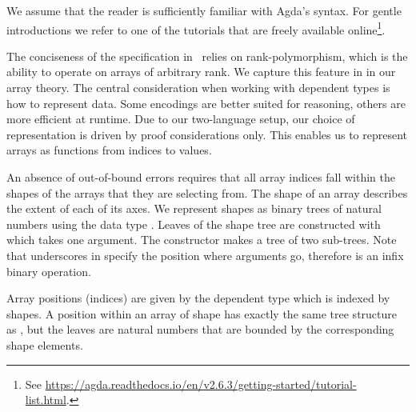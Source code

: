 We assume that the reader is sufficiently familiar with Agda's syntax.
For gentle introductions we refer to one of the tutorials that are freely available
online\footnote{See \url{https://agda.readthedocs.io/en/v2.6.3/getting-started/tutorial-list.html}.}.

The conciseness of the specification
in~\cite{cnn-array} relies on rank-polymorphism, which is the ability to operate
on arrays of arbitrary rank.  We capture this feature in in our array theory.
The central consideration when working with dependent types is how to represent data.
Some encodings are better suited for reasoning, others are more efficient
at runtime.  Due to our two-language setup, our choice of representation is
driven by proof considerations only.
This enables us to represent arrays as functions from indices to values.

An absence of out-of-bound errors requires that all array indices fall within
the shapes of the arrays that they are selecting from.
The shape of an array describes the extent of each of its axes.  We represent shapes
as binary trees of natural numbers using the data type .
Leaves of the shape tree are constructed with  which takes one
argument.  The  constructor makes a tree of two sub-trees.
Note that underscores in  specify the position where arguments
go, therefore  is an infix binary operation.

Array positions (indices) are given by the dependent type  which
is indexed by shapes.  A position within an array of shape  has exactly the
same tree structure as , but the leaves are natural numbers that
are bounded by the corresponding shape elements.


